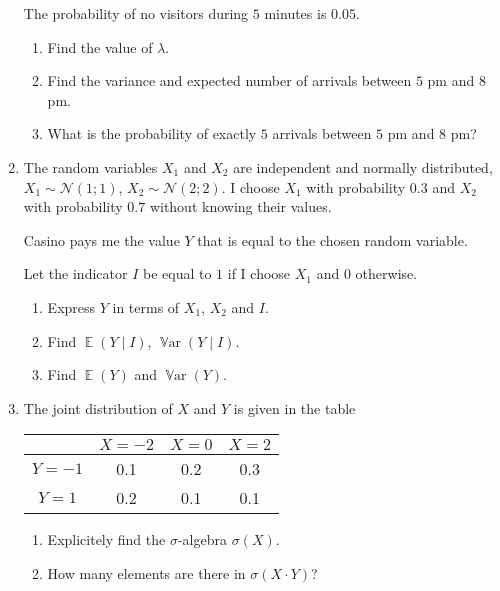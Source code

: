 \documentclass[12pt]{article}
\DeclareMathOperator{\Var}{\mathbb{V}ar}
\DeclareMathOperator{\E}{\mathbb{E}}
\newcommand \cN{\mathcal{N}}
\begin{document}
\begin{enumerate}
  The probability of no visitors during $5$ minutes is $0.05$. 
  
  \begin{enumerate}
    \item Find the value of $\lambda$.
    \item Find the variance and expected number of arrivals between $5$ pm and $8$ pm. 
    \item What is the probability of exactly $5$ arrivals between $5$ pm and $8$ pm?
  \end{enumerate}

  \item 
  The random variables $X_1$ and $X_2$ are independent and normally distributed, 
  $X_1 \sim \cN(1;1)$, $X_2 \sim \cN(2;2)$. 
  I choose $X_1$ with probability $0.3$ and $X_2$ with probability $0.7$ without knowing their values.
  
  Casino pays me the value $Y$ that is equal to the chosen random variable. 

  Let the indicator $I$ be equal to $1$ if I choose $X_1$ and $0$ otherwise. 

  \begin{enumerate}
    \item Express $Y$ in terms of $X_1$, $X_2$ and $I$.
    \item Find $\E(Y \mid I)$, $\Var(Y \mid I)$.
    \item Find $\E(Y)$ and $\Var(Y)$. 
  \end{enumerate}

  \item The joint distribution of $X$ and $Y$ is given in the table
    
    \begin{tabular}{*{4}{c}}
    \toprule
    & $X=-2$ & $X=0$ & $X=2$ \\
    \midrule
    $Y=-1$ & 0.1 & 0.2 & 0.3  \\
    $Y=1$ & 0.2 & 0.1 & 0.1  \\
    \bottomrule
    \end{tabular}
    
    \begin{enumerate}
     \item Explicitely find the $\sigma$-algebra $\sigma(X)$.
     \item How many elements are there in $\sigma(X \cdot Y)$?
    \end{enumerate}
    
\end{enumerate}
\end{document}
